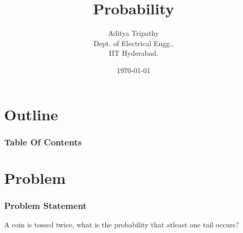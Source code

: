 \documentclass{beamer}
\title{Probability}
\author{Aditya Tripathy\\ Dept. of Electrical Engg.,\\IIT Hyderabad.}
\date{\today}
\theoremstyle{remark}
\let\vec\mathbf
\numberwithin{equation}{section}
\begin{document}
\begin{frame}
\titlepage
\end{frame}

\section*{Outline}
\begin{frame}
\frametitle{Table Of Contents}
\tableofcontents
\end{frame}
\section{Problem}
\begin{frame}
\frametitle{Problem Statement}
A coin is tossed twice, what is the probability that atleast one tail occurs?
\end{frame}

\end{document}

